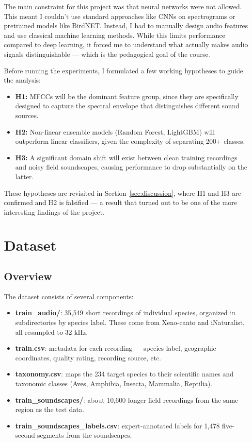 \documentclass[11pt,a4paper]{article}
\begin{document}
The main constraint for this project was that neural networks were not allowed. This meant I couldn't use standard approaches like CNNs on spectrograms or pretrained models like BirdNET. Instead, I had to manually design audio features and use classical machine learning methods. While this limits performance compared to deep learning, it forced me to understand what actually makes audio signals distinguishable — which is the pedagogical goal of the course.

Before running the experiments, I formulated a few working hypotheses to guide the analysis:

\begin{itemize}
    \item \textbf{H1:} MFCCs will be the dominant feature group, since they are specifically designed to capture the spectral envelope that distinguishes different sound sources.
    \item \textbf{H2:} Non-linear ensemble models (Random Forest, LightGBM) will outperform linear classifiers, given the complexity of separating 200+ classes.
    \item \textbf{H3:} A significant domain shift will exist between clean training recordings and noisy field soundscapes, causing performance to drop substantially on the latter.
\end{itemize}

These hypotheses are revisited in Section~\ref{sec:discussion}, where H1 and H3 are confirmed and H2 is falsified — a result that turned out to be one of the more interesting findings of the project.

\section{Dataset}

\subsection{Overview}

The dataset consists of several components:

\begin{itemize}
    \item \textbf{train\_audio/}: 35,549 short recordings of individual species, organized in subdirectories by species label. These come from Xeno-canto and iNaturalist, all resampled to 32 kHz.
    \item \textbf{train.csv}: metadata for each recording — species label, geographic coordinates, quality rating, recording source, etc.
    \item \textbf{taxonomy.csv}: maps the 234 target species to their scientific names and taxonomic classes (Aves, Amphibia, Insecta, Mammalia, Reptilia).
    \item \textbf{train\_soundscapes/}: about 10,600 longer field recordings from the same region as the test data.
    \item \textbf{train\_soundscapes\_labels.csv}: expert-annotated labels for 1,478 five-second segments from the soundscapes.
\end{itemize}
\end{document}
